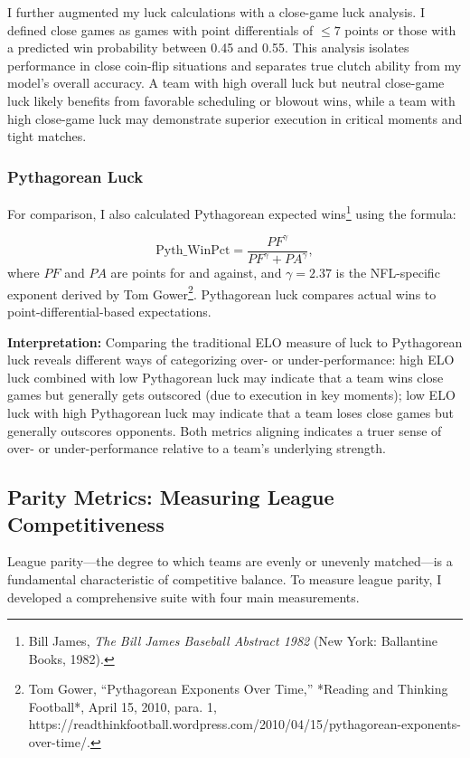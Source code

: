 \documentclass[a4paper,10.5pt,twoside]{article}
\begin{document}
I further augmented my luck calculations with a close-game luck analysis. I defined close games as games with point differentials of $\leq 7$ points or those with a predicted win probability between 0.45 and 0.55. This analysis isolates performance in close coin-flip situations and separates true clutch ability from my model's overall accuracy. A team with high overall luck but neutral close-game luck likely benefits from favorable scheduling or blowout wins, while a team with high close-game luck may demonstrate superior execution in critical moments and tight matches.

\subsubsection{Pythagorean Luck}

For comparison, I also calculated Pythagorean expected wins\footnote{Bill James, \textit{The Bill James Baseball Abstract 1982} (New York: Ballantine Books, 1982).} using the formula:

\[
\text{Pyth\_WinPct} = \frac{PF^\gamma}{PF^\gamma + PA^\gamma},
\]
where $PF$ and $PA$ are points for and against, and $\gamma = 2.37$ is the NFL-specific exponent derived by Tom Gower\footnote{Tom Gower, “Pythagorean Exponents Over Time,” *Reading and Thinking Football*, April 15, 2010, para. 1, https://readthinkfootball.wordpress.com/2010/04/15/pythagorean-exponents-over-time/.}. Pythagorean luck compares actual wins to point-differential-based expectations.

\textbf{Interpretation:} Comparing the traditional ELO measure of luck to Pythagorean luck reveals different ways of categorizing over- or under-performance: high ELO luck combined with low Pythagorean luck may indicate that a team wins close games but generally gets outscored (due to execution in key moments); low ELO luck with high Pythagorean luck may indicate that a team loses close games but generally outscores opponents. Both metrics aligning indicates a truer sense of over- or under-performance relative to a team's underlying strength.

\subsection{Parity Metrics: Measuring League Competitiveness}

League parity—the degree to which teams are evenly or unevenly matched—is a fundamental characteristic of competitive balance. To measure league parity, I developed a comprehensive suite with four main measurements.
\end{document}

